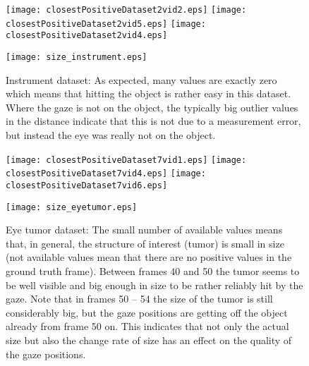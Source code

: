 \begin{figure}[ht]
	  \texttt{[image: closestPositiveDataset2vid2.eps]}
	  \texttt{[image: closestPositiveDataset2vid5.eps]}
	  \texttt{[image: closestPositiveDataset2vid4.eps]}
	  
	  \vspace{3mm}
	  \texttt{[image: size\_instrument.eps]}
	  \caption{Instrument dataset: As expected, many values are exactly zero which means that hitting the object is rather easy in this dataset. Where the gaze is not on the object, the typically big outlier values in the distance indicate that this is not due to a measurement error, but instead the eye was really not on the object.}
	\label{fig:distanceToClosestPositiveD2}
\end{figure}

\begin{figure}[ht]
	  \texttt{[image: closestPositiveDataset7vid1.eps]}
	  \texttt{[image: closestPositiveDataset7vid4.eps]}
	  \texttt{[image: closestPositiveDataset7vid6.eps]}
	  
	  \vspace{3mm}
	  \texttt{[image: size\_eyetumor.eps]}	  
	  \caption{Eye tumor dataset: The small number of available values means that, in general, the structure of interest (tumor) is small in size (not available values mean that there are no positive values in the ground truth frame). Between frames 40 and 50 the tumor seems to be well visible and big enough in size to be rather reliably hit by the gaze. Note that in frames 50 -- 54 the size of the tumor is still considerably big, but the gaze positions are getting off the object already from frame 50 on. This indicates that not only the actual size but also the change rate of size has an effect on the quality of the gaze positions.}
	\label{fig:distanceToClosestPositiveD7}
\end{figure}

